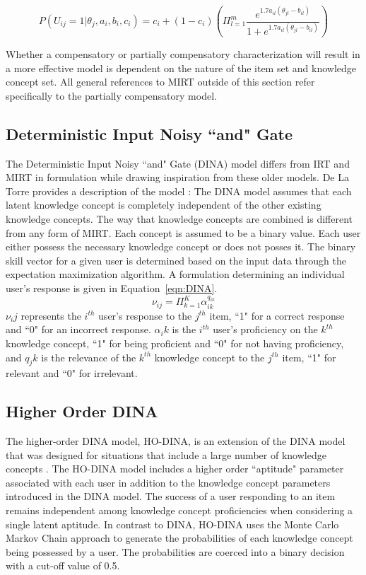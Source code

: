 \documentclass[letterpaper, 12pt, captions=tableabove]{scrreprt}
\begin{document}
		\begin{equation}
			\label{eqn:pcMIRT}
			P(U_{ij} = 1 | \theta_j, a_i, b_i, c_i) = c_i +(1-c_i)( \Pi^m_{l=1}\frac{e^{1.7a_{il}(\theta_{jl}-b_{il})}}{1+ e^{1.7a_{il}(\theta_{jl}-b_{il})}} )
		\end{equation} 

Whether a compensatory or partially compensatory characterization will result in a more effective model is dependent on the nature of the item set and knowledge concept set. All general references to MIRT outside of this section refer specifically to the partially compensatory model.

		\subsection{Deterministic Input Noisy ``and" Gate}
		\label{sub:DINA}

			The Deterministic Input Noisy ``and" Gate (DINA) model differs from IRT and MIRT in formulation while drawing inspiration from these older models. De La Torre provides a description of the model \cite{delatorre2009}: The DINA model assumes that each latent knowledge concept is completely independent of the other existing knowledge concepts. The way that knowledge concepts are combined is different from any form of MIRT. Each concept is assumed to be a binary value. Each user either possess the necessary knowledge concept or does not posses it. The binary skill vector for a given user is determined based on the input data through the expectation maximization algorithm. A formulation determining an individual user's response is given in Equation~\ref{eqn:DINA}.
			\begin{equation}
				\label{eqn:DINA}
				\nu_{ij} = \Pi^K_{k=1}\alpha_{ik}^{q_{ik}}
			\end{equation}
			$\nu_ij$ represents the $i^{th}$ user's response to the $j^{th}$ item, ``1" for a correct response and ``0" for an incorrect response. $\alpha_ik$ is the $i^{th}$ user's proficiency on the  $k^{th}$ knowledge concept, ``1" for being proficient and ``0" for not having proficiency, and $q_jk$ is the relevance of the  $k^{th}$ knowledge concept to the  $j^{th}$ item, ``1" for relevant and ``0" for irrelevant. 

		\subsection{Higher Order DINA}
		\label{sub:HO-DINA}
			The higher-order DINA model, HO-DINA, is an extension of the DINA model that was designed for situations that include a large number of knowledge concepts \cite{delatorre2004}. The HO-DINA model includes a higher order ``aptitude" parameter associated with each user in addition to the knowledge concept parameters introduced in the DINA model. The success of a user responding to an item remains independent among knowledge concept proficiencies when considering a single latent aptitude. In contrast to DINA, HO-DINA uses the Monte Carlo Markov Chain approach to generate the probabilities of each knowledge concept being possessed by a user. The probabilities are coerced into a binary decision with a cut-off value of 0.5. 
\end{document}
